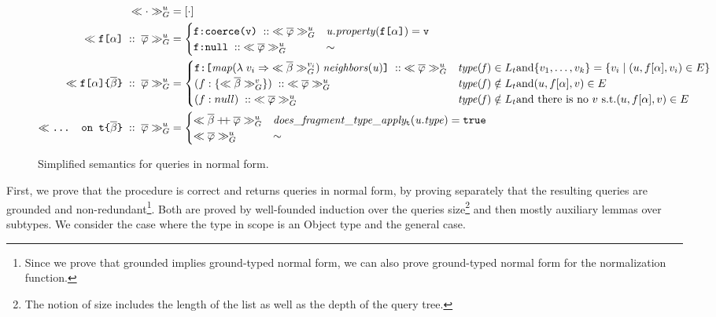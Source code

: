 \setcounter{equation}{0}%
\begin{figure*}[h]
    \centering
    \begin{align}
    \ll \cdot \gg^{u}_{G} &= [\cdot] \\
    \ll \texttt{f[}\alpha\texttt{]}\; ::\; \overline{\varphi} \gg^{u}_{G} &= \begin{cases}
    \texttt{f}\texttt{:}\texttt{coerce(\texttt{v})} \; ::\; \ll \overline{\varphi} \gg^{u}_{G}  & \mathit{u.property}(\texttt{f[}\alpha\texttt{]}) = \texttt{v} \\
    \texttt{f}\texttt{:}\texttt{null} \; :: \; \ll \overline{\varphi} \gg^{u}_{G} & \sim
    \end{cases}\\
    \ll \texttt{f[}\alpha\texttt{]} \texttt{\{}\overline{\beta}\texttt{\}} \; ::\; \overline{\varphi} \gg^{u}_{G} &=
    \begin{cases}
    \texttt{f}\texttt{:}\texttt{[} \mathit{map} (\lambda\; v_{i} \Rightarrow\; \ll \overline{\beta} \gg^{v_{i}}_{G})\; \mathit{neighbors(u)} \texttt{]} \; :: \; \ll \overline{\varphi} \gg^{u}_{G}  & \mathit{type(f)} \in L_{t} \text{and} \{v_{1}, \ldots, v_{k}\} = \{v_{i} \mid (u, f[\alpha], v_{i}) \in E\} \\
    (f:\{\ll \overline{\beta} \gg^{v}_{G}\})\; :: \; \ll \overline{\varphi} \gg^{u}_{G}  & \mathit{type(f)} \notin L_{t} \text{and} (u, f[\alpha], v) \in E \\
    (f:null)\; :: \; \ll \overline{\varphi} \gg^{u}_{G} & \mathit{type(f)} \notin L_{t} \text{and there is no } v \text{ s.t.} (u, f[\alpha], v) \in E \\
    \end{cases}\\
    \ll \texttt{... on t}\texttt{\{}\overline{\beta}\texttt{\}}\; ::\; \overline{\varphi} \gg^{u}_{G} &= \begin{cases}
    \ll \overline{\beta} \mathbin{+\mkern-5mu+} \overline{\varphi} \gg^{u}_{G} & \mathit{does\_fragment\_type\_apply_{\texttt{t}}(u.type)} = \texttt{true}\\
    \ll \overline{\varphi} \gg^{u}_{G} & \sim
    \end{cases}
    \end{align}
    \caption{Simplified semantics for queries in normal form.}
    \label{fig:simpl_semantics}
\end{figure*}


First, we prove that the procedure is correct and returns queries in normal form, by proving separately that the resulting queries are grounded and non-redundant\footnote{Since we prove that grounded implies ground-typed normal form, we can also prove ground-typed normal form for the normalization function.}. Both are proved by well-founded induction over the queries size\footnote{The notion of size includes the length of the list as well as the depth of the query tree.} and then mostly auxiliary lemmas over subtypes.  We consider the case where the type in scope is an Object type and the general case. 

